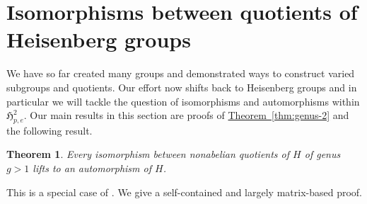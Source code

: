 \documentclass[11pt]{article}
\numberwithin{equation}{section}
\theoremstyle{definition}
\theoremstyle{plain}
\newcommand{\expref}[2]{\hyperref[#2]{#1~\ref{#2}}}
\numberwithin{equation}{section}
\theoremstyle{plain}       %
\newtheorem{thm}[equation]{Theorem}
\theoremstyle{remark}
\theoremstyle{definition}
\numberwithin{figure}{section}
\numberwithin{table}{section}
\newcommand{\mygroups}{\mathfrak{H}}
\begin{document}
%
\section{Isomorphisms between quotients of Heisenberg groups}
We have so far created many groups and demonstrated ways to construct varied
subgroups and quotients.  Our effort now shifts back to Heisenberg groups and in
particular we will tackle the question of isomorphisms and automorphisms within
$\mygroups_{p,e}^{2}$.  Our main results in this section are proofs of
\expref{Theorem}{thm:genus-2} and the following result.

\begin{thm}\label{thm:adj-tensor}
	Every isomorphism between nonabelian quotients of $H$ of genus $g>1$ lifts
	to an automorphism of $H$.
\end{thm}

This is a special case of \cite[Theorem~4.4]{LW}. We give a self-contained and
largely matrix-based proof.
\end{document}
